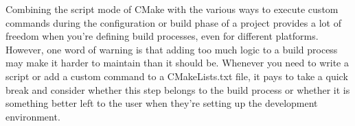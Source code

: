 Combining the script mode of CMake with the various ways to execute custom commands during the configuration or build phase of a project provides a lot of freedom when you're defining build processes, even for different platforms. However, one word of warning is that adding too much logic to a build process may make it harder to maintain than it should be. Whenever you need to write a script or add a custom command to a CMakeLists.txt file, it pays to take a quick break and consider whether this step belongs to the build process or whether it is something better left to the user when they're setting up the development environment.





























